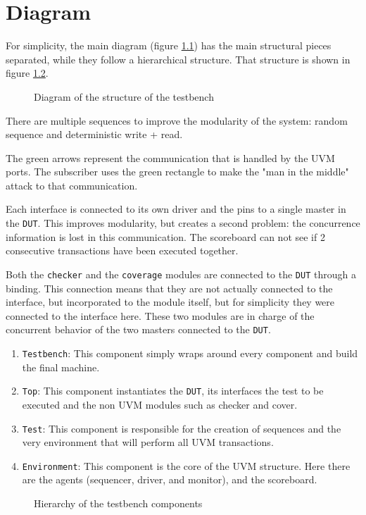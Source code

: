 \chapter{Diagram} 
\label{cha:diagram}

For simplicity, the main diagram (figure \ref{fig:diagram}) has the main structural pieces separated, while they follow a hierarchical structure.
That structure is shown in figure \ref{fig:hierarchy}.

\begin{figure}[htb]
  \centering
  
  \caption{Diagram of the structure of the testbench}
  \label{fig:diagram}
\end{figure}

There are multiple sequences to improve the modularity of the system: random sequence and deterministic write + read.

The green arrows represent the communication that is handled by the UVM ports.
The subscriber uses the green rectangle to make the "man in the middle" attack to that communication.

Each interface is connected to its own driver and the pins to a single master in the \texttt{DUT}.
This improves modularity, but creates a second problem: the concurrence information is lost in this communication.
The scoreboard can not see if 2 consecutive transactions have been executed together.

Both the \texttt{checker} and the \texttt{coverage} modules are connected to the \texttt{DUT} through a binding.
This connection means that they are not actually connected to the interface, but incorporated to the module itself, but for simplicity they were connected to the interface here.
These two modules are in charge of the concurrent behavior of the two masters connected to the \texttt{DUT}.


\begin{enumerate}
    \item \texttt{Testbench}: This component simply wraps around every component and build the final machine.
    \item \texttt{Top}: This component instantiates the \texttt{DUT}, its interfaces the test to be executed and the non UVM modules such as checker and cover.
    \item \texttt{Test}: This component is responsible for the creation of sequences and the very environment that will perform all UVM transactions.
    \item \texttt{Environment}: This component is the core of the UVM structure. Here there are the agents (sequencer, driver, and monitor), and the scoreboard. 
\end{enumerate}

\begin{figure}[h!]
  \centering
  
  \caption{Hierarchy of the testbench components}
  \label{fig:hierarchy}
\end{figure}